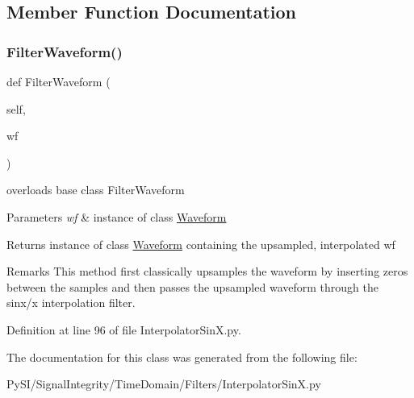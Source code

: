 \subsection{Member Function Documentation}
\mbox{\label{classSignalIntegrity_1_1TimeDomain_1_1Filters_1_1InterpolatorSinX_1_1InterpolatorSinX_a84e73c18250ca4a61482f94ad61e735b}} 
\subsubsection{\texorpdfstring{Filter\+Waveform()}{FilterWaveform()}}
{\footnotesize\ttfamily def Filter\+Waveform (\begin{DoxyParamCaption}\item[{}]{self,  }\item[{}]{wf }\end{DoxyParamCaption})}



overloads base class Filter\+Waveform 


\begin{DoxyParams}{Parameters}
{\em wf} & instance of class \hyperlink{namespaceSignalIntegrity_1_1TimeDomain_1_1Waveform}{Waveform} \\
\hline
\end{DoxyParams}
\begin{DoxyReturn}{Returns}
instance of class \hyperlink{namespaceSignalIntegrity_1_1TimeDomain_1_1Waveform}{Waveform} containing the upsampled, interpolated wf 
\end{DoxyReturn}
\begin{DoxyRemark}{Remarks}
This method first classically upsamples the waveform by inserting zeros between the samples and then passes the upsampled waveform through the sinx/x interpolation filter. 
\end{DoxyRemark}


Definition at line 96 of file Interpolator\+Sin\+X.\+py.



The documentation for this class was generated from the following file\+:\begin{DoxyCompactItemize}
\item 
Py\+S\+I/\+Signal\+Integrity/\+Time\+Domain/\+Filters/Interpolator\+Sin\+X.\+py\end{DoxyCompactItemize}
